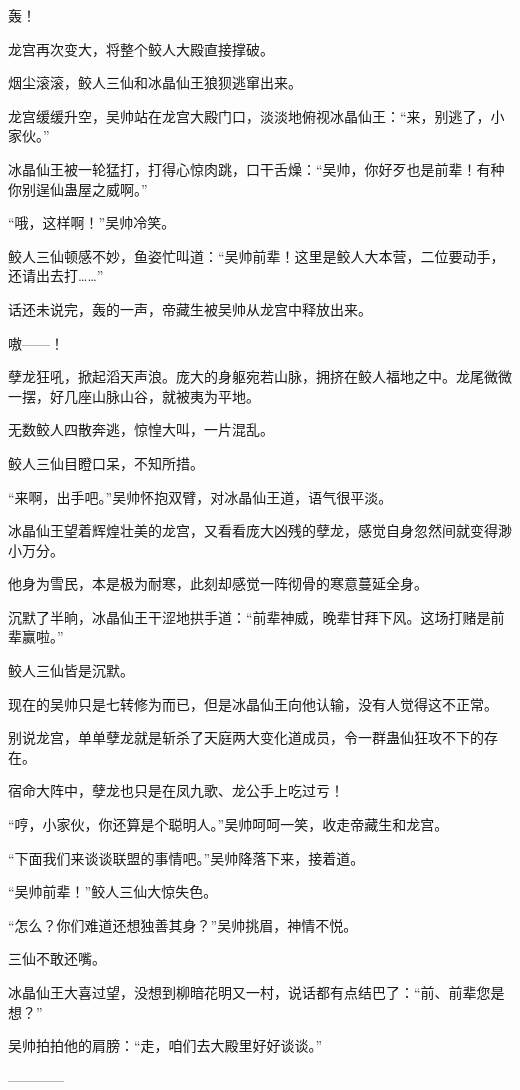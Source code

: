 \begin{this_body}
轰！

龙宫再次变大，将整个鲛人大殿直接撑破。

烟尘滚滚，鲛人三仙和冰晶仙王狼狈逃窜出来。

龙宫缓缓升空，吴帅站在龙宫大殿门口，淡淡地俯视冰晶仙王：“来，别逃了，小家伙。”

冰晶仙王被一轮猛打，打得心惊肉跳，口干舌燥：“吴帅，你好歹也是前辈！有种你别逞仙蛊屋之威啊。”

“哦，这样啊！”吴帅冷笑。

鲛人三仙顿感不妙，鱼姿忙叫道：“吴帅前辈！这里是鲛人大本营，二位要动手，还请出去打……”

话还未说完，轰的一声，帝藏生被吴帅从龙宫中释放出来。

嗷——！

孽龙狂吼，掀起滔天声浪。庞大的身躯宛若山脉，拥挤在鲛人福地之中。龙尾微微一摆，好几座山脉山谷，就被夷为平地。

无数鲛人四散奔逃，惊惶大叫，一片混乱。

鲛人三仙目瞪口呆，不知所措。

“来啊，出手吧。”吴帅怀抱双臂，对冰晶仙王道，语气很平淡。

冰晶仙王望着辉煌壮美的龙宫，又看看庞大凶残的孽龙，感觉自身忽然间就变得渺小万分。

他身为雪民，本是极为耐寒，此刻却感觉一阵彻骨的寒意蔓延全身。

沉默了半晌，冰晶仙王干涩地拱手道：“前辈神威，晚辈甘拜下风。这场打赌是前辈赢啦。”

鲛人三仙皆是沉默。

现在的吴帅只是七转修为而已，但是冰晶仙王向他认输，没有人觉得这不正常。

别说龙宫，单单孽龙就是斩杀了天庭两大变化道成员，令一群蛊仙狂攻不下的存在。

宿命大阵中，孽龙也只是在凤九歌、龙公手上吃过亏！

“哼，小家伙，你还算是个聪明人。”吴帅呵呵一笑，收走帝藏生和龙宫。

“下面我们来谈谈联盟的事情吧。”吴帅降落下来，接着道。

“吴帅前辈！”鲛人三仙大惊失色。

“怎么？你们难道还想独善其身？”吴帅挑眉，神情不悦。

三仙不敢还嘴。

冰晶仙王大喜过望，没想到柳暗花明又一村，说话都有点结巴了：“前、前辈您是想？”

吴帅拍拍他的肩膀：“走，咱们去大殿里好好谈谈。”

------------

\end{this_body}

